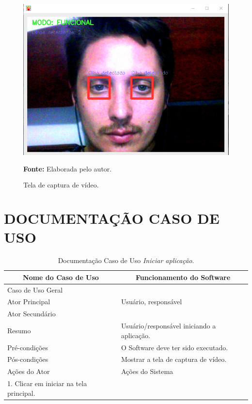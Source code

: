 \begin{figure}[H]
\caption{Tela de captura de vídeo.} 
\centering \includegraphics[scale=.45]{img/visiumouse-tela-captura-video.png}

{\fontsize{11}{11}\selectfont \textbf{Fonte:} Elaborada pelo autor.}
\label{fig:visiumouse-tela-captura-video}
\end{figure}



\chapter{DOCUMENTAÇÃO CASO DE USO}
\label{Apx:A}
\begin{longtable}{|l|l|}
\caption{Documentação Caso de Uso \textit{Iniciar aplicação}.} \label{tab:dcu-1} \\
\hline 
\multicolumn{1}{|c|}{\textbf{Nome do Caso de Uso}} & 
\multicolumn{1}{c|}{\textbf{Funcionamento do Software}} \\ \hline 
\endfirsthead
\hline
Caso de Uso Geral &  \\ \hline
Ator Principal & Usuário, responsável\\ \hline
Ator Secundário &  \\ \hline
Resumo & Usuário/responsável iniciando a aplicação. \\ \hline 
Pré-condições &  O Software deve ter sido executado. \\ \hline 
Pós-condições &  Mostrar a tela de captura de vídeo. \\ \hline
 Ações do Ator& Ações do Sistema \\ \hline
 1.	Clicar em iniciar na tela principal.&  \\ \hline
\end{longtable}

